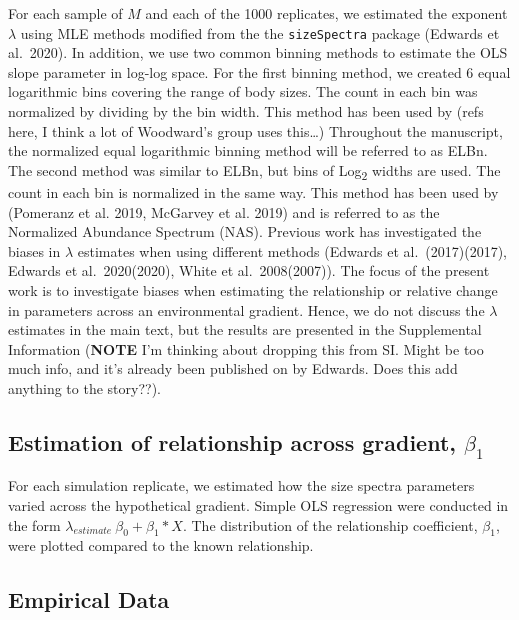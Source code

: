 \documentclass[
]{article}
\begin{document}
For each sample of \(M\) and each of the 1000 replicates, we estimated
the exponent \(\lambda\) using MLE methods modified from the the
\texttt{sizeSpectra} package (Edwards et al.~2020). In addition, we use
two common binning methods to estimate the OLS slope parameter in
log-log space. For the first binning method, we created 6 equal
logarithmic bins covering the range of body sizes. The count in each bin
was normalized by dividing by the bin width. This method has been used
by (refs here, I think a lot of Woodward's group uses this\ldots)
Throughout the manuscript, the normalized equal logarithmic binning
method will be referred to as ELBn. The second method was similar to
ELBn, but bins of Log\textsubscript{2} widths are used. The count in
each bin is normalized in the same way. This method has been used by
(Pomeranz et al. 2019, McGarvey et al. 2019) and is referred to as the
Normalized Abundance Spectrum (NAS). Previous work has investigated the
biases in \(\lambda\) estimates when using different methods (Edwards et
al.~(2017)(2017), Edwards et al.~2020(2020), White et al.~2008(2007)).
The focus of the present work is to investigate biases when estimating
the relationship or relative change in parameters across an
environmental gradient. Hence, we do not discuss the \(\lambda\)
estimates in the main text, but the results are presented in the
Supplemental Information (\textbf{NOTE} I'm thinking about dropping this
from SI. Might be too much info, and it's already been published on by
Edwards. Does this add anything to the story??).

\hypertarget{estimation-of-relationship-across-gradient-beta_1}{%
\subsection{\texorpdfstring{Estimation of relationship across gradient,
\(\beta_1\)}{Estimation of relationship across gradient, \textbackslash beta\_1}}\label{estimation-of-relationship-across-gradient-beta_1}}

For each simulation replicate, we estimated how the size spectra
parameters varied across the hypothetical gradient. Simple OLS
regression were conducted in the form
\(\lambda_{estimate} ~ \beta_0 + \beta_1 * X\). The distribution of the
relationship coefficient, \(\beta_1\), were plotted compared to the
known relationship.

\hypertarget{empirical-data}{%
\subsection{Empirical Data}\label{empirical-data}}
\end{document}
